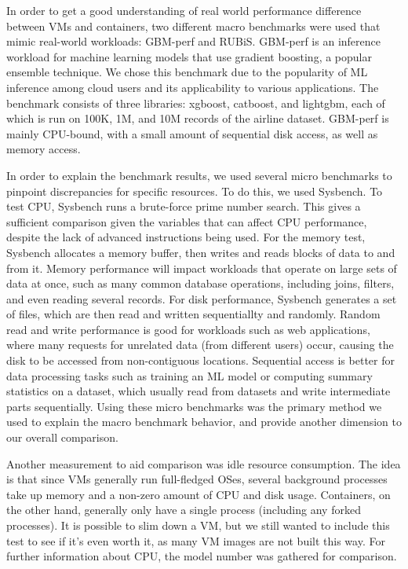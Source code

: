 \documentclass[11pt]{article}
\begin{document}
In order to get a good understanding of real world performance difference between VMs and containers, two different macro benchmarks were used that mimic real-world workloads: GBM-perf and RUBiS. GBM-perf is an inference workload for machine learning models that use gradient boosting, a popular ensemble technique. We chose this benchmark due to the popularity of ML inference among cloud users and its applicability to various applications. The benchmark consists of three libraries: xgboost, catboost, and lightgbm, each of which is run on 100K, 1M, and 10M records of the airline dataset. GBM-perf is mainly CPU-bound, with a small amount of sequential disk access, as well as memory access.

In order to explain the benchmark results, we used several micro benchmarks to pinpoint discrepancies for specific resources. To do this, we used Sysbench. To test CPU, Sysbench runs a brute-force prime number search. This gives a sufficient comparison given the variables that can affect CPU performance, despite the lack of advanced instructions being used. For the memory test, Sysbench allocates a memory buffer, then writes and reads blocks of data to and from it. Memory performance will impact workloads that operate on large sets of data at once, such as many common database operations, including joins, filters, and even reading several records. For disk performance, Sysbench generates a set of files, which are then read and written sequentiallty and randomly. Random read and write performance is good for workloads such as web applications, where many requests for unrelated data (from different users) occur, causing the disk to be accessed from non-contiguous locations. Sequential access is better for data processing tasks such as training an ML model or computing summary statistics on a dataset, which usually read from datasets and write intermediate parts sequentially. Using these micro benchmarks was the primary method we used to explain the macro benchmark behavior, and provide another dimension to our overall comparison.

Another measurement to aid comparison was idle resource consumption. The idea is that since VMs generally run full-fledged OSes, several background processes take up memory and a non-zero amount of CPU and disk usage. Containers, on the other hand, generally only have a single process (including any forked processes). It is possible to slim down a VM, but we still wanted to include this test to see if it's even worth it, as many VM images are not built this way. For further information about CPU, the model number was gathered for comparison.
\end{document}
